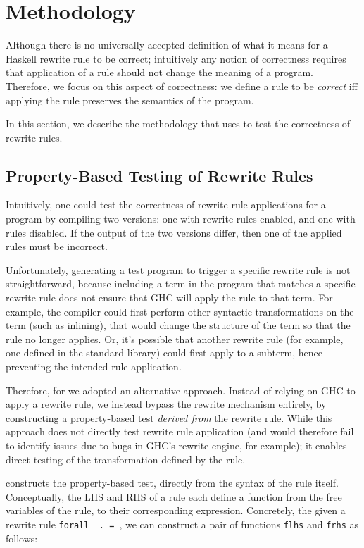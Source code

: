 \section{Methodology}
\label{sec:methodology}

Although there is no universally accepted definition of what it means for a
Haskell rewrite rule to be correct; intuitively any notion of correctness
requires that application of a rule should not change the meaning of a program.
Therefore, we focus on this aspect of correctness: we define a rule to be
\textit{correct} iff applying the rule preserves the semantics of the program.

In this section, we describe the methodology that \Rulecheck uses to test the
correctness of rewrite rules.

\subsection{Property-Based Testing of Rewrite Rules}\label{sec:methodology:testgen}

Intuitively, one could test the correctness of rewrite rule applications for a
program by compiling two versions: one with rewrite rules enabled, and one with
rules disabled. If the output of the two versions differ, then one of the
applied rules must be incorrect.

Unfortunately, generating a test program to trigger a specific rewrite rule is
not straightforward, because including a term in the program that matches a
specific rewrite rule does not ensure that GHC will apply the rule to that term.
For example, the compiler could first perform other syntactic transformations on
the term (such as inlining), that would change the structure of the term so that
the rule no longer applies. Or, it's possible that another rewrite rule (for
example, one defined in the standard library) could first apply to a subterm,
hence preventing the intended rule application.

Therefore, for \Rulecheck we adopted an alternative approach. Instead of relying
on GHC to apply a rewrite rule, we instead bypass the rewrite mechanism
entirely, by constructing a property-based test \textit{derived from} the
rewrite rule. While this approach does not directly test rewrite rule
application (and would therefore fail to identify issues due to bugs in GHC's
rewrite engine, for example); it enables direct testing of the transformation
defined by the rule.

\Rulecheck constructs the property-based test, directly from the syntax of the
rule itself. Conceptually, the LHS and RHS of a rule each define a function from
the free variables of the rule, to their corresponding expression. Concretely,
the given a rewrite rule \texttt{forall \rbinders~.~\rlhs = \rrhs}, we can
construct a pair of functions \texttt{flhs} and \texttt{frhs} as follows:


